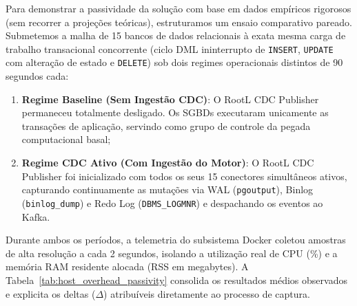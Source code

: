 \documentclass[12pt]{article}
\begin{document}
Para demonstrar a passividade da solução com base em dados empíricos rigorosos (sem recorrer a projeções teóricas), estruturamos um ensaio comparativo pareado. Submetemos a malha de 15 bancos de dados relacionais à exata mesma carga de trabalho transacional concorrente (ciclo DML ininterrupto de \texttt{INSERT}, \texttt{UPDATE} com alteração de estado e \texttt{DELETE}) sob dois regimes operacionais distintos de 90 segundos cada:
\begin{enumerate}
  \item \textbf{Regime Baseline (Sem Ingestão CDC)}: O RootL CDC Publisher permaneceu totalmente desligado. Os SGBDs executaram unicamente as transações de aplicação, servindo como grupo de controle da pegada computacional basal;
  \item \textbf{Regime CDC Ativo (Com Ingestão do Motor)}: O RootL CDC Publisher foi inicializado com todos os seus 15 conectores simultâneos ativos, capturando continuamente as mutações via WAL (\texttt{pgoutput}), Binlog (\texttt{binlog\_dump}) e Redo Log (\texttt{DBMS\_LOGMNR}) e despachando os eventos ao Kafka.
\end{enumerate}

Durante ambos os períodos, a telemetria do subsistema Docker coletou amostras de alta resolução a cada 2 segundos, isolando a utilização real de CPU (\%) e a memória RAM residente alocada (RSS em megabytes). A Tabela~\ref{tab:host_overhead_passivity} consolida os resultados médios observados e explicita os deltas ($\Delta$) atribuíveis diretamente ao processo de captura.

\begin{table}[H]
\centering
\caption{Avaliação Empírica de Passividade nos SGBDs Hospedeiros: Regime Baseline (Sem CDC) vs. Regime CDC Ativo (Com RootL).}
\label{tab:host_overhead_passivity}
\end{table}
\end{document}

